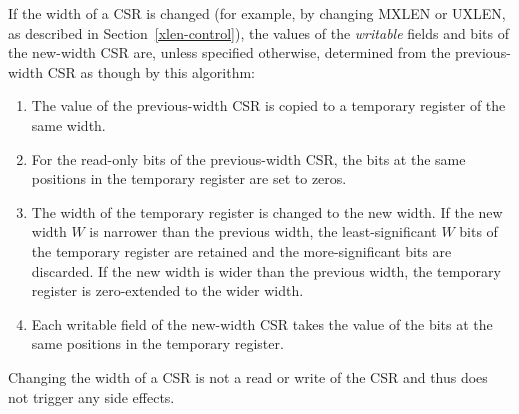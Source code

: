 If the width of a CSR is changed (for example, by changing MXLEN or UXLEN, as
described in Section~\ref{xlen-control}), the values of the {\em writable}
fields and bits of the new-width CSR are, unless specified otherwise,
determined from the previous-width CSR as though by this algorithm:

\begin{enumerate}

\item The value of the previous-width CSR is copied to a temporary register of
the same width.

\item For the read-only bits of the previous-width CSR, the bits at the same
positions in the temporary register are set to zeros.

\item The width of the temporary register is changed to the new width. If the
new width $W$ is narrower than the previous width, the least-significant $W$
bits of the temporary register are retained and the more-significant bits are
discarded. If the new width is wider than the previous width, the temporary
register is zero-extended to the wider width.

\item Each writable field of the new-width CSR takes the value of the bits at
the same positions in the temporary register.

\end{enumerate}

Changing the width of a CSR is not a read or write of the CSR and thus
does not trigger any side effects.
